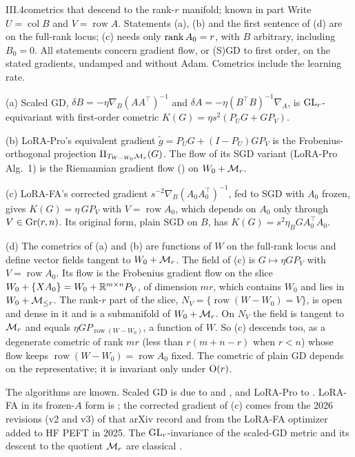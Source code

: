 \begin{proposition}{III.4}{cometrics that descend to the rank-$r$ manifold; known in part}
Write $U=\operatorname{col}B$ and $V=\operatorname{row}A$. Statements (a), (b) and the first sentence of (d) are on the full-rank locus; (c) needs only $\operatorname{rank} A_0=r$, with $B$ arbitrary, including $B_0=0$. All statements concern gradient flow, or (S)GD to first order, on the stated gradients, undamped and without Adam. Cometrics include the learning rate.

(a) Scaled GD, $\delta B=-\eta\nabla_B(AA^\top)^{-1}$ and $\delta A=-\eta(B^\top B)^{-1}\nabla_A$, is $\mathrm{GL}_r$-equivariant with first-order cometric $K(G)=\eta s^2(P_UG+GP_V)$.

(b) LoRA-Pro's equivalent gradient $\tilde g=P_UG+(I-P_U)GP_V$ is the Frobenius-orthogonal projection $\Pi_{T_{W-W_0}\mathcal{M}_r}(G)$. The flow of its SGD variant (LoRA-Pro Alg.~1) is the Riemannian gradient flow () on $W_0+\mathcal{M}_r$.

(c) LoRA-FA's corrected gradient $s^{-2}\nabla_B(A_0A_0^\top)^{-1}$, fed to SGD with $A_0$ frozen, gives $K(G)=\eta\,GP_V$ with $V=\operatorname{row}A_0$, which depends on $A_0$ only through $V\in\operatorname{Gr}(r,n)$. Its original form, plain SGD on $B$, has $K(G)=s^2\eta_BGA_0^\top A_0$.

(d) The cometrics of (a) and (b) are functions of $W$ on the full-rank locus and define vector fields tangent to $W_0+\mathcal{M}_r$. The field of (c) is $G\mapsto\eta GP_V$ with $V=\operatorname{row}A_0$. Its flow is the Frobenius gradient flow on the slice $W_0+\{XA_0\}=W_0+\mathbb{R}^{m\times n}P_V$, of dimension $mr$, which contains $W_0$ and lies in $W_0+\mathcal{M}_{\le r}$. The rank-$r$ part of the slice, $N_V=\{\operatorname{row}(W-W_0)=V\}$, is open and dense in it and is a submanifold of $W_0+\mathcal{M}_r$. On $N_V$ the field is tangent to $\mathcal{M}_r$ and equals $\eta GP_{\operatorname{row}(W-W_0)}$, a function of $W$. So (c) descends too, as a degenerate cometric of rank $mr$ (less than $r(m+n-r)$ when $r<n$) whose flow keeps $\operatorname{row}(W-W_0)=\operatorname{row}A_0$ fixed. The cometric of plain GD depends on the representative; it is invariant only under $\mathrm{O}(r)$.
\end{proposition}

The algorithms are known. Scaled GD is due to \citet{xtong2021accelerating} and \citet{zhang2024riemannian}, and LoRA-Pro to \citet{wang2024lorac}. LoRA-FA in its frozen-$A$ form is \citet{zhang2023lora}; the corrected gradient of (c) comes from the 2026 revisions (v2 and v3) of that arXiv record and from the LoRA-FA optimizer added to HF PEFT \citep{xmangrulkar2022peft} in 2025. The $\mathrm{GL}_r$-invariance of the scaled-GD metric and its descent to the quotient $\mathcal{M}_r$ are classical \citep{mishra2012fixed,xmishra2016riemannian}.

